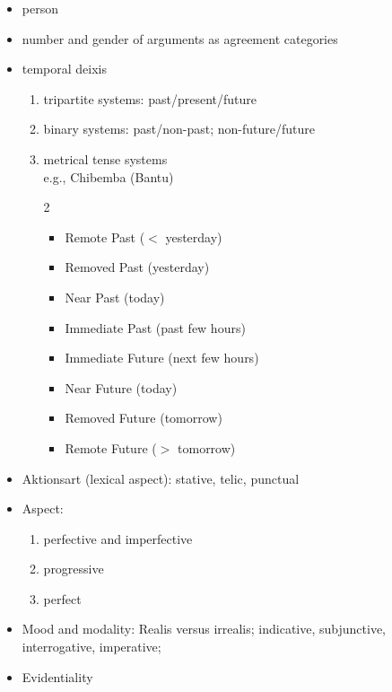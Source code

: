 \documentclass[a4paper,landscape,headrule,footrule]{foils}
\begin{document}
  \begin{itemize}
  \item
    person
  \item
  number and gender of arguments as agreement categories
  \item
 temporal deixis
\begin{enumerate}
	\item tripartite systems: past/present/future
    	\item binary systems: past/non-past; non-future/future
    	\item metrical tense systems
    \\  e.g., Chibemba (Bantu) 
  \begin{multicols}{2}
  \begin{itemize}
  \item  Remote Past ($<$ yesterday)
  \item  Removed Past (yesterday)
  \item  Near Past (today)
  \item  Immediate Past (past few hours)
  \item Immediate Future (next few hours)
  \item Near Future (today)
  \item Removed Future (tomorrow)
  \item Remote Future ($>$ tomorrow)
  \end{itemize}
\end{multicols}  
\end{enumerate}      \newpage
  \item
Aktionsart (lexical aspect): stative, telic, punctual
  \item
Aspect:
\begin{enumerate}
	\item perfective and imperfective
	\item progressive
	\item perfect
\end{enumerate}
\item
Mood and modality:  Realis versus irrealis; indicative, subjunctive, interrogative, imperative;
\item
Evidentiality
  \end{itemize}

\end{document}
